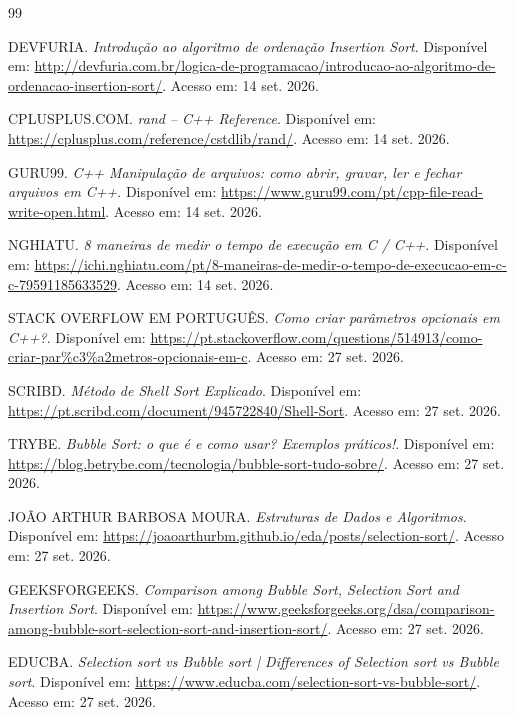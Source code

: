 \begin{thebibliography}{99}

DEVFURIA.
\textit{Introdução ao algoritmo de ordenação Insertion Sort}.
Disponível em:
\url{http://devfuria.com.br/logica-de-programacao/introducao-ao-algoritmo-de-ordenacao-insertion-sort/}.
Acesso em: 14 set. 2026.

CPLUSPLUS.COM.
\textit{rand -- C++ Reference}.
Disponível em:
\url{https://cplusplus.com/reference/cstdlib/rand/}.
Acesso em: 14 set. 2026.

GURU99.
\textit{C++ Manipulação de arquivos: como abrir, gravar, ler e fechar arquivos em C++}.
Disponível em:
\url{https://www.guru99.com/pt/cpp-file-read-write-open.html}.
Acesso em: 14 set. 2026.

NGHIATU.
\textit{8 maneiras de medir o tempo de execução em C / C++}.
Disponível em:
\url{https://ichi.nghiatu.com/pt/8-maneiras-de-medir-o-tempo-de-execucao-em-c-c-79591185633529}.
Acesso em: 14 set. 2026.

STACK OVERFLOW EM PORTUGUÊS.
\textit{Como criar parâmetros opcionais em C++?}.
Disponível em:
\url{https://pt.stackoverflow.com/questions/514913/como-criar-par%c3%a2metros-opcionais-em-c}.
Acesso em: 27 set. 2026.

SCRIBD.
\textit{Método de Shell Sort Explicado}.
Disponível em:
\url{https://pt.scribd.com/document/945722840/Shell-Sort}.
Acesso em: 27 set. 2026.

TRYBE.
\textit{Bubble Sort: o que é e como usar? Exemplos práticos!}.
Disponível em:
\url{https://blog.betrybe.com/tecnologia/bubble-sort-tudo-sobre/}.
Acesso em: 27 set. 2026.

JOÃO ARTHUR BARBOSA MOURA.
\textit{Estruturas de Dados e Algoritmos}.
Disponível em:
\url{https://joaoarthurbm.github.io/eda/posts/selection-sort/}.
Acesso em: 27 set. 2026.

GEEKSFORGEEKS.
\textit{Comparison among Bubble Sort, Selection Sort and Insertion Sort}.
Disponível em:
\url{https://www.geeksforgeeks.org/dsa/comparison-among-bubble-sort-selection-sort-and-insertion-sort/}.
Acesso em: 27 set. 2026.

EDUCBA.
\textit{Selection sort vs Bubble sort | Differences of Selection sort vs Bubble sort}.
Disponível em:
\url{https://www.educba.com/selection-sort-vs-bubble-sort/}.
Acesso em: 27 set. 2026.


\end{thebibliography}
